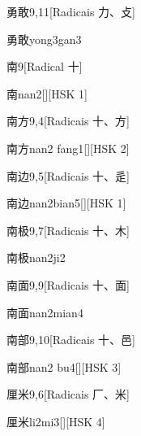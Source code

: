 \begin{entry}{勇敢}{9,11}[Radicais ⼒、⽁]
  \begin{phonetics}{勇敢}{yong3gan3}
  \end{phonetics}
\end{entry}

\begin{entry}{南}{9}[Radical ⼗]
  \begin{phonetics}{南}{nan2}[][HSK 1]
  \end{phonetics}
\end{entry}

\begin{entry}{南方}{9,4}[Radicais ⼗、⽅]
  \begin{phonetics}{南方}{nan2 fang1}[][HSK 2]
  \end{phonetics}
\end{entry}

\begin{entry}{南边}{9,5}[Radicais ⼗、⾡]
  \begin{phonetics}{南边}{nan2bian5}[][HSK 1]
  \end{phonetics}
\end{entry}

\begin{entry}{南极}{9,7}[Radicais ⼗、⽊]
  \begin{phonetics}{南极}{nan2ji2}
  \end{phonetics}
\end{entry}

\begin{entry}{南面}{9,9}[Radicais ⼗、⾯]
  \begin{phonetics}{南面}{nan2mian4}
  \end{phonetics}
\end{entry}

\begin{entry}{南部}{9,10}[Radicais ⼗、⾢]
  \begin{phonetics}{南部}{nan2 bu4}[][HSK 3]
  \end{phonetics}
\end{entry}

\begin{entry}{厘米}{9,6}[Radicais ⼚、⽶]
  \begin{phonetics}{厘米}{li2mi3}[][HSK 4]
  \end{phonetics}
\end{entry}

